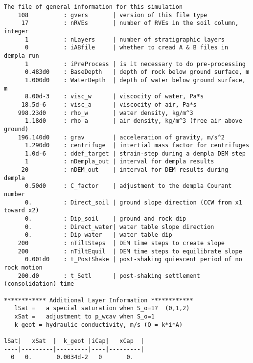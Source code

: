 \begin{verbatim}
The file of general information for this simulation
    108          : gvers       | version of this file type
     17          : nRVEs       | number of RVEs in the soil column, integer
      1          : nLayers     | number of stratigraphic layers
      0          : iABfile     | whether to cread A & B files in dempla run
      1          : iPreProcess | is it necessary to do pre-processing
      0.483d0    : BaseDepth   | depth of rock below ground surface, m
      1.000d0    : WaterDepth  | depth of water below ground surface, m
      8.00d-3    : visc_w      | viscocity of water, Pa*s
     18.5d-6     : visc_a      | viscocity of air, Pa*s
    998.23d0     : rho_w       | water density, kg/m^3
      1.18d0     : rho_a       | air density, kg/m^3 (free air above ground)
    196.140d0    : grav        | acceleration of gravity, m/s^2
      1.290d0    : centrifuge  | intertial mass factor for centrifuges
      1.0d-6     : ddef_target | strain-step during a dempla DEM step
      1          : nDempla_out | interval for dempla results
     20          : nDEM_out    | interval for DEM results during dempla
      0.50d0     : C_factor    | adjustment to the dempla Courant number
      0.         : Direct_soil | ground slope direction (CCW from x1 toward x2)
      0.         : Dip_soil    | ground and rock dip
      0.         : Direct_water| water table slope direction
      0.         : Dip_water   | water table dip
    200          : nTiltSteps  | DEM time steps to create slope
    200          : nTiltEquil  | DEM time steps to equilibrate slope
      0.001d0    : t_PostShake | post-shaking quiescent period of no rock motion
    200.d0       : t_Setl      | post-shaking settlement (consolidation) time

************ Additional Layer Information ************
   lSat =   a special saturation when S_o=1?  (0,1,2)
   xSat =   adjustment to p_wcav when S_o=1
   k_geot = hydraulic conductivity, m/s (Q = k*i*A)
   
lSat|   xSat  |  k_geot |iCap|   xCap  |
----|---------|---------|----|---------|
  0   0.       0.0034d-2   0       0.   
\end{verbatim}
